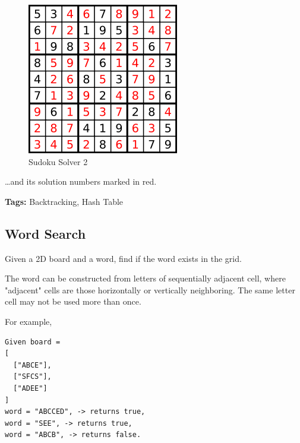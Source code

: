 \documentclass[12pt]{book}
\begin{document}
\begin{figure}[htb]
\centering
\includegraphics[width=.9\linewidth]{./pic/solveSudoku2.png}
\caption{Sudoku Solver 2}
\end{figure}
\ldots{}and its solution numbers marked in red.

\textbf{Tags:} Backtracking, Hash Table

\subsection{Word Search}
\label{sec-11-2-4}
Given a 2D board and a word, find if the word exists in the grid.

The word can be constructed from letters of sequentially adjacent cell, where "adjacent" cells are those horizontally or vertically neighboring. The same letter cell may not be used more than once.

For example,
\lstset{language=java,label= ,caption= ,numbers=none}
\begin{lstlisting}
Given board =
[
  ["ABCE"],
  ["SFCS"],
  ["ADEE"]
]
word = "ABCCED", -> returns true,
word = "SEE", -> returns true,
word = "ABCB", -> returns false.
\end{lstlisting}
\end{document}
